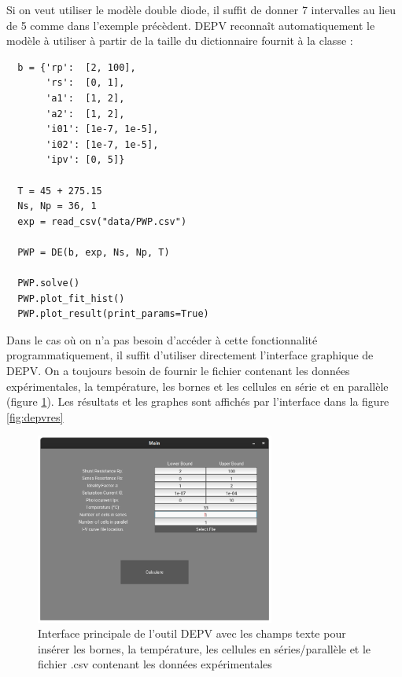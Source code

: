 Si on veut utiliser le modèle double diode, il suffit de donner 7 intervalles au lieu de 5 comme dans l'exemple précèdent. DEPV reconnaît automatiquement le modèle à utiliser à partir de la taille du dictionnaire  fournit à la classe :
\begin{verbatim}
  b = {'rp':  [2, 100],
       'rs':  [0, 1],
       'a1':  [1, 2],
       'a2':  [1, 2],
       'i01': [1e-7, 1e-5],
       'i02': [1e-7, 1e-5],
       'ipv': [0, 5]}
       
  T = 45 + 275.15
  Ns, Np = 36, 1
  exp = read_csv("data/PWP.csv")
  
  PWP = DE(b, exp, Ns, Np, T)
  
  PWP.solve()
  PWP.plot_fit_hist()
  PWP.plot_result(print_params=True)
\end{verbatim}


Dans le cas où on n'a pas besoin d'accéder à cette fonctionnalité programmatiquement, il suffit d'utiliser directement l'interface graphique de DEPV. On a toujours besoin de fournir le fichier contenant les données expérimentales, la température, les bornes et les cellules en série et en parallèle (figure \ref{fig:depvmain}). Les résultats et les graphes sont affichés par l'interface dans la figure \ref{fig:depvres}

\begin{figure}[H]
  \begin{center}
    \includegraphics[width=0.7\textwidth]{resources/paramwindow.png}
    \caption{Interface principale de l'outil DEPV avec les champs texte pour insérer les bornes, la température, les cellules en séries/parallèle et le fichier .csv contenant les données expérimentales}
    \label{fig:depvmain}
  \end{center}
\end{figure}

